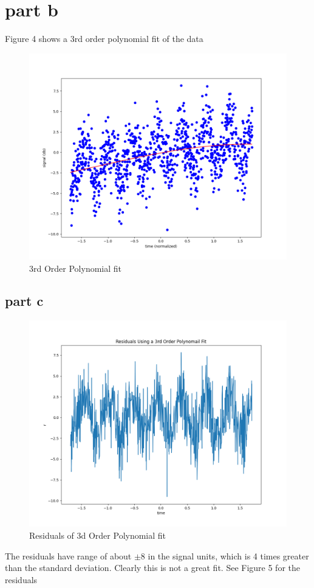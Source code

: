 \documentclass{article}
\begin{document}
\section{part b}
Figure 4 shows a 3rd order polynomial fit of the data
\begin{figure}[h]
    \centering
    \includegraphics[width=.8\linewidth]{ps5_figs/3b.png}
    \caption{3rd Order Polynomial fit}
    \label{fig:enter-label}
\end{figure}

\subsection{part c}
\begin{figure}[h]
    \centering
    \includegraphics[width=0.8 \linewidth]{ps5_figs/3c.png}
    \caption{Residuals of 3d Order Polynomial fit}
    \label{fig:enter-label}
\end{figure}
The residuals have range of about $\pm8$ in the signal units, which is 4 times greater than the standard deviation. Clearly this is not a great fit. See Figure 5 for the residuals
\end{document}
